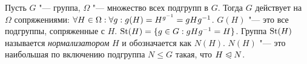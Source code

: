 \begin{example}
	Пусть $G$ "--- группа, $\Omega$ "--- множество всех подгрупп в $G$. Тогда $G$ действует на $\Omega$ сопряжениями: $\forall H \in \Omega: \forall g: g(H) = H^{g^{-1}} \hm= gHg^{-1}$. $G(H)$ "--- это все подгруппы, сопряженные с $H$. $\St(H) \hm= \{g \in G: gHg^{-1} = H\}$. Группа $\operatorname{St}(H)$ называется \textit{нормализатором} $H$ и обозначается как $N(H)$. $N(H)$ "--- это наибольшая по включению подгруппа $N \le G$ такая, что $H \trianglelefteqslant N$.
\end{example}